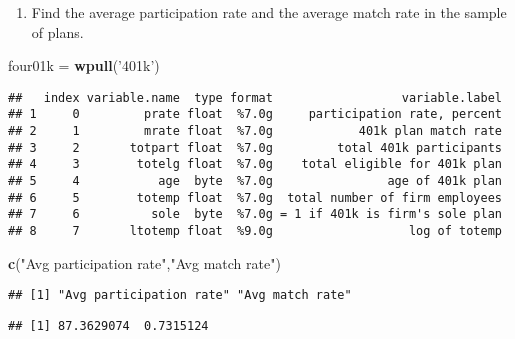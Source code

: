 \documentclass[]{article}
\newenvironment{Shaded}{\begin{snugshade}}{\end{snugshade}}
\newcommand{\KeywordTok}[1]{\textcolor[rgb]{0.13,0.29,0.53}{\textbf{#1}}}
\newcommand{\StringTok}[1]{\textcolor[rgb]{0.31,0.60,0.02}{#1}}
\newcommand{\OperatorTok}[1]{\textcolor[rgb]{0.81,0.36,0.00}{\textbf{#1}}}
\newcommand{\NormalTok}[1]{#1}
\providecommand{\tightlist}{%
  \setlength{\itemsep}{0pt}\setlength{\parskip}{0pt}}
\begin{document}
\begin{enumerate}
\def\labelenumi{\arabic{enumi}.}
\tightlist
\item
  Find the average participation rate and the average match rate in the
  sample of plans.
\end{enumerate}

\begin{Shaded}
\begin{Highlighting}[]
\NormalTok{four01k =}\StringTok{ }\KeywordTok{wpull}\NormalTok{(}\StringTok{'401k'}\NormalTok{)}
\end{Highlighting}
\end{Shaded}

\begin{verbatim}
##   index variable.name  type format                  variable.label
## 1     0         prate float  %7.0g     participation rate, percent
## 2     1         mrate float  %7.0g            401k plan match rate
## 3     2       totpart float  %7.0g         total 401k participants
## 4     3        totelg float  %7.0g    total eligible for 401k plan
## 5     4           age  byte  %7.0g                age of 401k plan
## 6     5        totemp float  %7.0g  total number of firm employees
## 7     6          sole  byte  %7.0g = 1 if 401k is firm's sole plan
## 8     7       ltotemp float  %9.0g                   log of totemp
\end{verbatim}

\begin{Shaded}
\begin{Highlighting}[]
\KeywordTok{c}\NormalTok{(}\StringTok{"Avg participation rate"}\NormalTok{,}\StringTok{"Avg match rate"}\NormalTok{)}
\end{Highlighting}
\end{Shaded}

\begin{verbatim}
## [1] "Avg participation rate" "Avg match rate"
\end{verbatim}

\begin{Shaded}
\end{Shaded}

\begin{verbatim}
## [1] 87.3629074  0.7315124
\end{verbatim}
\end{document}
